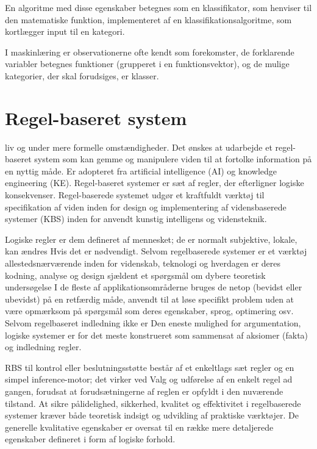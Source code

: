 En algoritme med disse egenskaber betegnes som en klassifikator, som henviser til den matematiske funktion, implementeret af en klassifikationsalgoritme, som kortlægger input til en kategori.

I maskinlæring er observationerne ofte kendt som forekomster, de forklarende variabler betegnes funktioner (grupperet i en funktionsvektor), og de mulige kategorier, der skal forudsiges, er klasser. 

\section{Regel-baseret system}
liv og under mere formelle omstændigheder.
Det ønskes at udarbejde et regel-baseret system som kan gemme og manipulere viden til at fortolke information på en nyttig måde. Er adopteret fra artificial intelligence (AI) og knowledge engineering (KE). Regel-baseret systemer er sæt af regler, der efterligner logiske konsekvenser. Regel-baserede systemet udgør et kraftfuldt værktøj til specifikation af viden inden for design og implementering af vidensbaserede systemer (KBS) inden for anvendt kunstig intelligens og vidensteknik. 

Logiske regler
er dem defineret af mennesket; de er normalt subjektive, lokale, kan ændres
Hvis det er nødvendigt. Selvom regelbaserede systemer er et værktøj allestedsnærværende inden for videnskab, teknologi
og hverdagen er deres kodning, analyse og design sjældent et spørgsmål om
dybere teoretisk undersøgelse I de fleste af applikationsområderne bruges de netop (bevidst eller ubevidst) på en retfærdig måde, anvendt til at løse specifikt problem uden at være opmærksom på spørgsmål som deres egenskaber,
sprog, optimering osv. Selvom regelbaseret indledning ikke er
Den eneste mulighed for argumentation, logiske systemer er for det meste konstrueret som
sammensat af aksiomer (fakta) og indledning regler.

RBS til kontrol eller beslutningsstøtte
består af et enkeltlags sæt regler og en simpel inference-motor; det virker ved
Valg og udførelse af en enkelt regel ad gangen, forudsat at forudsætningerne
af reglen er opfyldt i den nuværende tilstand. 
At sikre pålidelighed, sikkerhed, kvalitet og effektivitet i regelbaserede systemer kræver både teoretisk indsigt
og udvikling af praktiske værktøjer. De generelle kvalitative egenskaber er
oversat til en række mere detaljerede egenskaber defineret i form af
logiske forhold.

